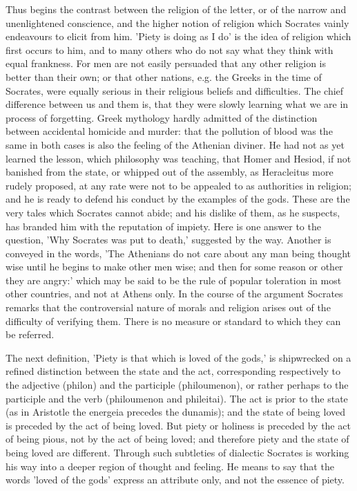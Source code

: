 \documentclass[11pt,letter]{article}
\begin{document}
\par  Thus begins the contrast between the religion of the letter, or of the narrow and unenlightened conscience, and the higher notion of religion which Socrates vainly endeavours to elicit from him. 'Piety is doing as I do' is the idea of religion which first occurs to him, and to many others who do not say what they think with equal frankness. For men are not easily persuaded that any other religion is better than their own; or that other nations, e.g. the Greeks in the time of Socrates, were equally serious in their religious beliefs and difficulties. The chief difference between us and them is, that they were slowly learning what we are in process of forgetting. Greek mythology hardly admitted of the distinction between accidental homicide and murder: that the pollution of blood was the same in both cases is also the feeling of the Athenian diviner. He had not as yet learned the lesson, which philosophy was teaching, that Homer and Hesiod, if not banished from the state, or whipped out of the assembly, as Heracleitus more rudely proposed, at any rate were not to be appealed to as authorities in religion; and he is ready to defend his conduct by the examples of the gods. These are the very tales which Socrates cannot abide; and his dislike of them, as he suspects, has branded him with the reputation of impiety. Here is one answer to the question, 'Why Socrates was put to death,' suggested by the way. Another is conveyed in the words, 'The Athenians do not care about any man being thought wise until he begins to make other men wise; and then for some reason or other they are angry:' which may be said to be the rule of popular toleration in most other countries, and not at Athens only. In the course of the argument Socrates remarks that the controversial nature of morals and religion arises out of the difficulty of verifying them. There is no measure or standard to which they can be referred.

\par  The next definition, 'Piety is that which is loved of the gods,' is shipwrecked on a refined distinction between the state and the act, corresponding respectively to the adjective (philon) and the participle (philoumenon), or rather perhaps to the participle and the verb (philoumenon and phileitai). The act is prior to the state (as in Aristotle the energeia precedes the dunamis); and the state of being loved is preceded by the act of being loved. But piety or holiness is preceded by the act of being pious, not by the act of being loved; and therefore piety and the state of being loved are different. Through such subtleties of dialectic Socrates is working his way into a deeper region of thought and feeling. He means to say that the words 'loved of the gods' express an attribute only, and not the essence of piety.
\end{document}
